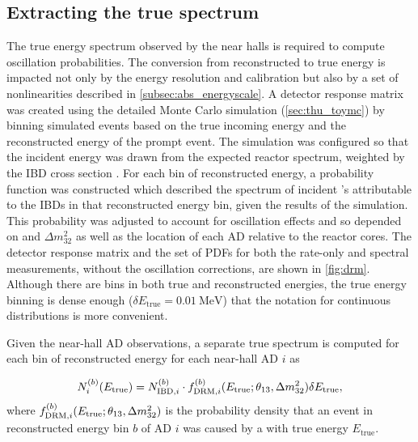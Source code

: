 \subsection{Extracting the true \texorpdfstring{\nuebar{}}{antineutrino} spectrum}
\label{subsec:reco_to_true_energy}

The true \nuebar{} energy spectrum observed by the near halls
is required to compute oscillation probabilities.
The conversion from reconstructed to true energy
is impacted not only by the energy resolution and calibration
but also by a set of nonlinearities described in \cref{subsec:abs_energyscale}.
A detector response matrix was created
using the detailed Monte Carlo simulation (\cref{sec:thu_toymc})
by binning simulated events based on the true incoming \nuebar{} energy
and the reconstructed energy of the prompt event.
The simulation was configured so that the incident \nuebar{} energy
was drawn from the expected reactor \nuebar{} spectrum,
weighted by the IBD cross section .
For each bin of reconstructed energy,
a probability function was constructed
which described the spectrum of incident \nuebar{}'s
attributable to the IBDs in that reconstructed energy bin,
given the results of the simulation.
This probability was adjusted to account for
oscillation effects and so depended on \thetaot{} and $\Delta m^2_{32}${}
as well as the location of each AD relative to the reactor cores.
The detector response matrix and the set of PDFs
for both the rate-only and spectral measurements,
without the oscillation corrections,
are shown in \cref{fig:drm}.
Although there are bins in both true and reconstructed energies,
the true energy binning is dense enough ($\delta E_{\text{true}} = \SI{0.01}{\MeV}$)
that the notation for continuous distributions is more convenient.

Given the near-hall AD observations,
a separate true \nuebar{} spectrum is computed
for each bin of reconstructed energy for each near-hall AD $i$ as

\begin{equation}\label{eq:drm}
    N_i^{(b)}(E_{\text{true}}) = N_{\text{IBD},i}^{(b)}
    \cdot f_{\text{DRM},i}^{(b)}(E_{\text{true}}; \theta_{13}, \Delta m^2_{32}) \delta E_{\text{true}},
\end{equation}
where $f_{\text{DRM},i}^{(b)}(E_{\text{true}}; \theta_{13}, \Delta m^2_{32})$ is the probability density
that an event in reconstructed energy bin $b$
of AD $i$
was caused by a \nuebar{} with true energy $E_{\text{true}}$.

